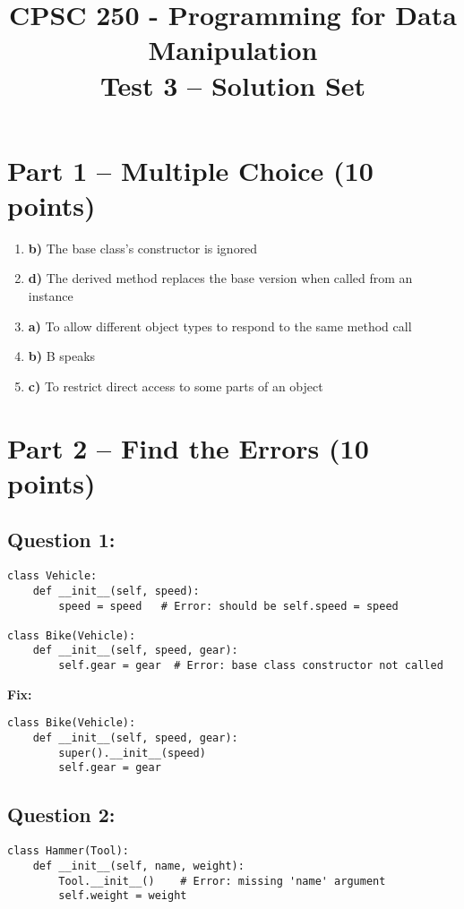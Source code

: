 \documentclass[12pt]{article}
\title{CPSC 250 - Programming for Data Manipulation\\Test 3 -- \textbf{Solution Set}}
\date{}
\begin{document}
\maketitle

\section*{Part 1 – Multiple Choice (10 points)}

\begin{enumerate}[label=\arabic*.]
    \item \textbf{b)} The base class’s constructor is ignored
    \item \textbf{d)} The derived method replaces the base version when called from an instance
    \item \textbf{a)} To allow different object types to respond to the same method call
    \item \textbf{b)} B speaks
    \item \textbf{c)} To restrict direct access to some parts of an object
\end{enumerate}

\section*{Part 2 – Find the Errors (10 points)}

\subsection*{Question 1:}
\begin{verbatim}
class Vehicle:
    def __init__(self, speed):
        speed = speed   # Error: should be self.speed = speed

class Bike(Vehicle):
    def __init__(self, speed, gear):
        self.gear = gear  # Error: base class constructor not called
\end{verbatim}

\textbf{Fix:}
\begin{verbatim}
class Bike(Vehicle):
    def __init__(self, speed, gear):
        super().__init__(speed)
        self.gear = gear
\end{verbatim}

\subsection*{Question 2:}
\begin{verbatim}
class Hammer(Tool):
    def __init__(self, name, weight):
        Tool.__init__()    # Error: missing 'name' argument
        self.weight = weight
\end{verbatim}
\end{document}
